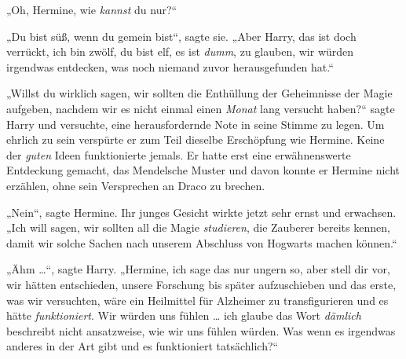 „Oh, Hermine, wie \emph{kannst} du nur?“

„Du bist süß, wenn du gemein bist“, sagte sie.
„Aber Harry, das ist doch verrückt, ich bin zwölf, du bist elf, es ist \emph{dumm}, zu glauben, wir würden irgendwas entdecken, was noch niemand zuvor herausgefunden hat.“

„Willst du wirklich sagen, wir sollten die Enthüllung der Geheimnisse der Magie aufgeben, nachdem wir es nicht einmal einen \emph{Monat} lang versucht haben?“ sagte Harry und versuchte, eine herausfordernde Note in seine Stimme zu legen. Um ehrlich zu sein verspürte er zum Teil dieselbe Erschöpfung wie Hermine. Keine der \emph{guten} Ideen funktionierte jemals. Er hatte erst eine erwähnenswerte Entdeckung gemacht, das Mendelsche Muster und davon konnte er Hermine nicht erzählen, ohne sein Versprechen an Draco zu brechen.

„Nein“, sagte Hermine. Ihr junges Gesicht wirkte jetzt sehr ernst und erwachsen.
„Ich will sagen, wir sollten all die Magie \emph{studieren}, die Zauberer bereits kennen, damit wir solche Sachen nach unserem Abschluss von Hogwarts machen können.“

„Ähm …“, sagte Harry.
„Hermine, ich sage das nur ungern so, aber stell dir vor, wir hätten entschieden, unsere Forschung bis später aufzuschieben und das erste, was wir versuchten, wäre ein Heilmittel für Alzheimer zu transfigurieren und es hätte \emph{funktioniert}. Wir würden uns fühlen … ich glaube das Wort \emph{dämlich} beschreibt nicht ansatzweise, wie wir uns fühlen würden. Was wenn es irgendwas anderes in der Art gibt und es funktioniert tatsächlich?“

